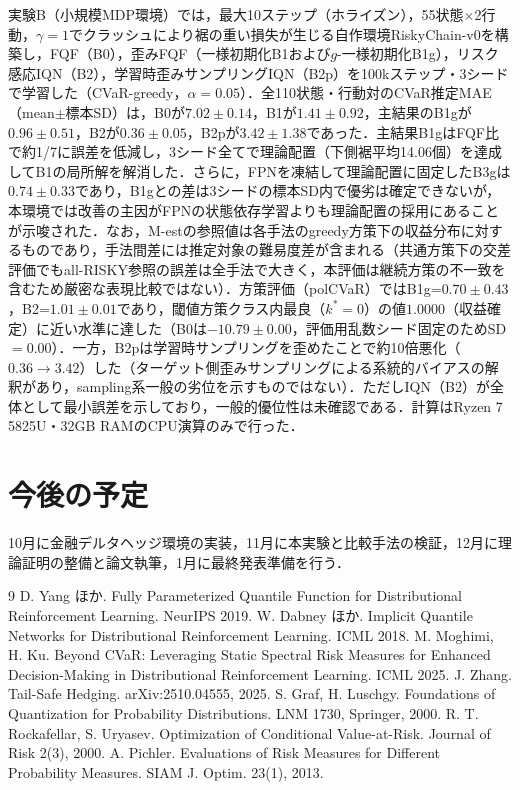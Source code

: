 \documentclass[a4paper,twocolumn,10pt]{jsarticle}
\begin{document}
実験B（小規模MDP環境）では，最大10ステップ（ホライズン），55状態$\times$2行動，$\gamma=1$でクラッシュにより裾の重い損失が生じる自作環境RiskyChain-v0を構築し，FQF（B0），歪みFQF（一様初期化B1および$g$-一様初期化B1g），リスク感応IQN（B2），学習時歪みサンプリングIQN（B2p）を100kステップ・3シードで学習した（CVaR-greedy，$\alpha=0.05$）．全110状態・行動対のCVaR推定MAE（mean$\pm$標本SD）は，B0が$7.02\pm0.14$，B1が$1.41\pm0.92$，主結果のB1gが$0.96\pm0.51$，B2が$0.36\pm0.05$，B2pが$3.42\pm1.38$であった．主結果B1gはFQF比で約1/7に誤差を低減し，3シード全てで理論配置（下側裾平均14.06個）を達成してB1の局所解を解消した．さらに，FPNを凍結して理論配置に固定したB3gは$0.74\pm0.33$であり，B1gとの差は3シードの標本SD内で優劣は確定できないが，本環境では改善の主因がFPNの状態依存学習よりも理論配置の採用にあることが示唆された．なお，M-estの参照値は各手法のgreedy方策下の収益分布に対するものであり，手法間差には推定対象の難易度差が含まれる（共通方策下の交差評価でもall-RISKY参照の誤差は全手法で大きく，本評価は継続方策の不一致を含むため厳密な表現比較ではない）．方策評価（polCVaR）ではB1g=$0.70\pm0.43$，B2=$1.01\pm0.01$であり，閾値方策クラス内最良（$k^*=0$）の値$1.0000$（収益確定）に近い水準に達した（B0は$-10.79\pm0.00$，評価用乱数シード固定のためSD$=0.00$）．一方，B2pは学習時サンプリングを歪めたことで約10倍悪化（$0.36\to3.42$）した（ターゲット側歪みサンプリングによる系統的バイアスの解釈があり，sampling系一般の劣位を示すものではない）．ただしIQN（B2）が全体として最小誤差を示しており，一般的優位性は未確認である．計算はRyzen 7 5825U・32GB RAMのCPU演算のみで行った．

\section{今後の予定}
10月に金融デルタヘッジ環境の実装，11月に本実験と比較手法の検証，12月に理論証明の整備と論文執筆，1月に最終発表準備を行う．

\begin{thebibliography}{9}
\scriptsize
\setlength{\itemsep}{-2pt}
\setlength{\parskip}{0pt}
 D. Yang ほか. Fully Parameterized Quantile Function for Distributional Reinforcement Learning. NeurIPS 2019.
 W. Dabney ほか. Implicit Quantile Networks for Distributional Reinforcement Learning. ICML 2018.
 M. Moghimi, H. Ku. Beyond CVaR: Leveraging Static Spectral Risk Measures for Enhanced Decision-Making in Distributional Reinforcement Learning. ICML 2025.
 J. Zhang. Tail-Safe Hedging. arXiv:2510.04555, 2025.
 S. Graf, H. Luschgy. Foundations of Quantization for Probability Distributions. LNM 1730, Springer, 2000.
 R. T. Rockafellar, S. Uryasev. Optimization of Conditional Value-at-Risk. Journal of Risk 2(3), 2000.
 A. Pichler. Evaluations of Risk Measures for Different Probability Measures. SIAM J. Optim. 23(1), 2013.
\end{thebibliography}
\end{document}
